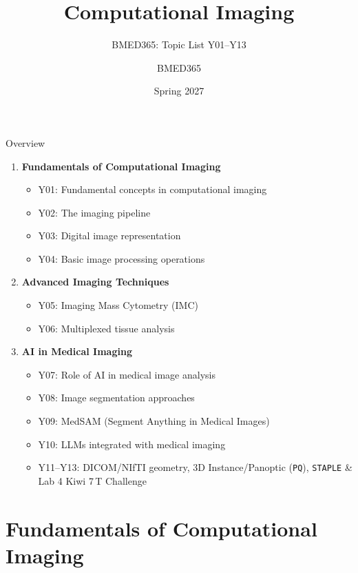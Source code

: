 \documentclass[aspectratio=169, 10pt]{beamer}
\title{Computational Imaging}
\subtitle{BMED365: Topic List Y01--Y13}
\author{BMED365}
\date{Spring 2027}
\begin{document}
\begin{frame}
    \titlepage
\end{frame}

\begin{frame}{Overview}
    \begin{enumerate}
        \item \textbf{Fundamentals of Computational Imaging}
        \begin{itemize}
            \item Y01: Fundamental concepts in computational imaging
            \item Y02: The imaging pipeline
            \item Y03: Digital image representation
            \item Y04: Basic image processing operations
        \end{itemize}
        \item \textbf{Advanced Imaging Techniques}
        \begin{itemize}
            \item Y05: Imaging Mass Cytometry (IMC)
            \item Y06: Multiplexed tissue analysis
        \end{itemize}
        \item \textbf{AI in Medical Imaging}
        \begin{itemize}
            \item Y07: Role of AI in medical image analysis
            \item Y08: Image segmentation approaches
            \item Y09: MedSAM (Segment Anything in Medical Images)
            \item Y10: LLMs integrated with medical imaging
            \item Y11--Y13: DICOM/NIfTI geometry, 3D Instance/Panoptic (\texttt{PQ}), \texttt{STAPLE} \& Lab 4 Kiwi 7\,T Challenge
        \end{itemize}
    \end{enumerate}
\end{frame}

\section{Fundamentals of Computational Imaging}
\end{document}
